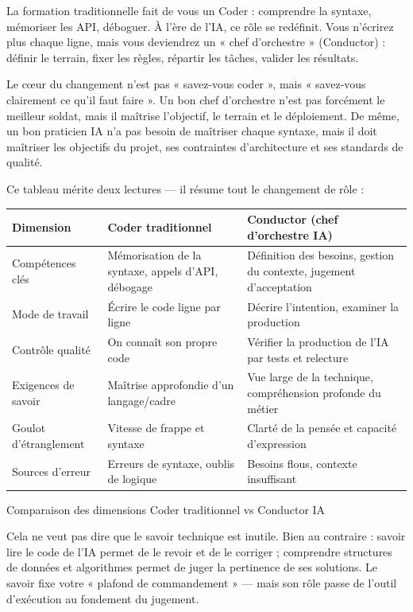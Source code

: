 La formation traditionnelle fait de vous un Coder : comprendre la syntaxe, mémoriser les API, déboguer. À l'ère de l'IA, ce rôle se redéfinit. Vous n'écrirez plus chaque ligne, mais vous deviendrez un « chef d'orchestre » (Conductor) : définir le terrain, fixer les règles, répartir les tâches, valider les résultats.

Le cœur du changement n'est pas « savez-vous coder », mais « savez-vous clairement ce qu'il faut faire ». Un bon chef d'orchestre n'est pas forcément le meilleur soldat, mais il maîtrise l'objectif, le terrain et le déploiement. De même, un bon praticien IA n'a pas besoin de maîtriser chaque syntaxe, mais il doit maîtriser les objectifs du projet, ses contraintes d'architecture et ses standards de qualité.

Ce tableau mérite deux lectures — il résume tout le changement de rôle :

\begin{center}
\begin{tabularx}{\linewidth}{|X|X|X|}
\hline
\textbf{Dimension} & \textbf{Coder traditionnel} & \textbf{Conductor (chef d'orchestre IA)} \tabularnewline
\hline
Compétences clés & Mémorisation de la syntaxe, appels d'API, débogage & Définition des besoins, gestion du contexte, jugement d'acceptation \tabularnewline
Mode de travail & Écrire le code ligne par ligne & Décrire l'intention, examiner la production \tabularnewline
Contrôle qualité & On connaît son propre code & Vérifier la production de l'IA par tests et relecture \tabularnewline
Exigences de savoir & Maîtrise approfondie d'un langage/cadre & Vue large de la technique, compréhension profonde du métier \tabularnewline
Goulot d'étranglement & Vitesse de frappe et syntaxe & Clarté de la pensée et capacité d'expression \tabularnewline
Sources d'erreur & Erreurs de syntaxe, oublis de logique & Besoins flous, contexte insuffisant \tabularnewline
\hline
\end{tabularx}
\end{center}

\begin{center}\small\color{gray}Comparaison des dimensions Coder traditionnel vs Conductor IA\end{center}

Cela ne veut pas dire que le savoir technique est inutile. Bien au contraire : savoir lire le code de l'IA permet de le revoir et de le corriger ; comprendre structures de données et algorithmes permet de juger la pertinence de ses solutions. Le savoir fixe votre « plafond de commandement » — mais son rôle passe de l'outil d'exécution au fondement du jugement.

